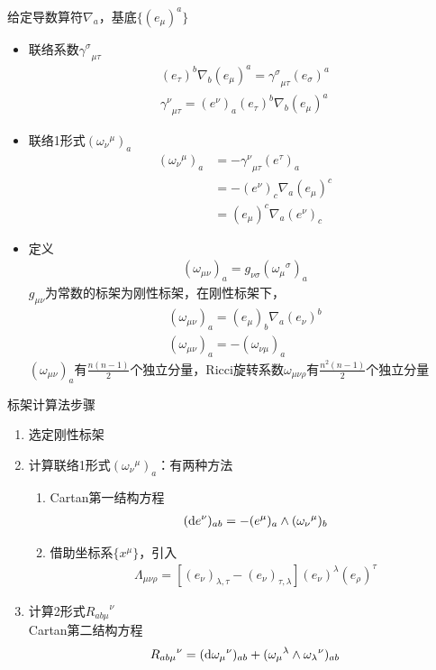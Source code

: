 给定导数算符$\nabla_a$，基底$\{(e_\mu)^a\}$
\begin{itemize}
    \item 联络系数${\gamma^{\sigma}}_{\mu \tau}$
    \begin{gather*}
        (e_{\tau})^b \nabla_b (e_{\mu})^a={\gamma^{\sigma}}_{\mu \tau} (e_{\sigma})^a
        \\
        {\gamma^{\nu}}_{\mu \tau}=(e^{\nu})_a (e_{\tau})^b \nabla_b (e_{\mu})^a
    \end{gather*}
    \item 联络1形式$({\omega_{\nu}}^{\mu})_a$
    \begin{align*}
        ({\omega_{\nu}}^{\mu})_a&=-{\gamma^{\nu}}_{\mu \tau} (e^{\tau})_a
        \\
        &=-(e^{\nu})_c \nabla_a (e_{\mu})^c
        \\
        &=(e_{\mu})^c \nabla_a (e^{\nu})_c
    \end{align*}
    \item 定义
    \begin{gather*}
        (\omega_{\mu \nu})_a=g_{\nu \sigma} ({\omega_{\mu}}^{\sigma})_a
    \end{gather*}
    $g_{\mu \nu}$为常数的标架为刚性标架，在刚性标架下，
    \begin{gather*}
        (\omega_{\mu \nu})_a=(e_{\mu})_b \nabla_a (e_{\nu})^b
        \\
        (\omega_{\mu \nu})_a=-(\omega_{\nu \mu})_a
    \end{gather*}
    $(\omega_{\mu \nu})_a$有$\frac{n(n-1)}{2}$个独立分量，Ricci旋转系数$\omega_{\mu \nu \rho}$有$\frac{n^2(n-1)}{2}$个独立分量
\end{itemize}

标架计算法步骤
\begin{enumerate}
    \item 选定刚性标架
    \item 计算联络1形式$({\omega_{\nu}}^{\mu})_a$：有两种方法
    \begin{enumerate}
        \item Cartan第一结构方程
        \begin{gather*}
            (\mathrm{d} e^\nu)_{ab}=-(e^{\mu})_a \wedge ({\omega_{\nu}}^{\mu})_b
        \end{gather*}
        \item 借助坐标系$\{x^{\mu}\}$，引入
        \begin{gather*}
            \Lambda_{\mu \nu \rho}=[(e_{\nu})_{\lambda,\tau}-(e_{\nu})_{\tau,\lambda}](e_{\nu})^{\lambda} (e_{\rho})^{\tau}
        \end{gather*}
    \end{enumerate}
    \item 计算2形式${R_{ab\mu}}^{\nu}$\\
    Cartan第二结构方程
    \begin{gather*}
        {R_{ab\mu}}^{\nu}=(\mathrm{d} {\omega_{\mu}}^{\nu})_{ab}+({\omega_{\mu}}^{\lambda} \wedge {\omega_{\lambda}}^{\nu})_{ab}
    \end{gather*}
\end{enumerate}

